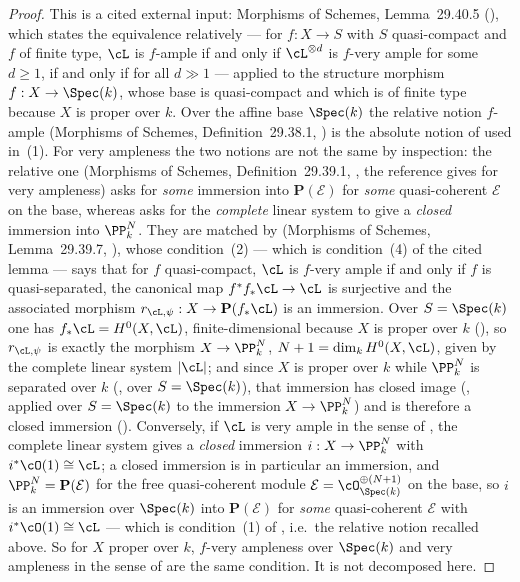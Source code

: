 \begin{proof}
This is a cited external input: Morphisms of Schemes, Lemma~29.40.5
(), which states
the equivalence relatively --- for $f:X\to S$ with $S$ quasi-compact
and $f$ of finite type, $\cL$ is $f$-ample if and only if
$\cL^{\otimes d}$ is $f$-very ample for some $d\ge1$, if and only if
for all $d\gg1$ --- applied to the structure morphism
$f:X\to\Spec(k)$, whose base is quasi-compact and which is of finite
type because $X$ is proper over $k$.  Over the affine base $\Spec(k)$
the relative notion $f$-ample (Morphisms of Schemes,
Definition~29.38.1, ) is
the absolute notion of  used in~(1).  For very
ampleness the two notions are not the same by inspection: the relative
one (Morphisms of Schemes, Definition~29.39.1,
, the reference
 gives for very ampleness) asks for \emph{some}
immersion into $\mathbf P(\mathcal E)$ for \emph{some} quasi-coherent
$\mathcal E$ on the base, whereas  asks for the
\emph{complete} linear system to give a \emph{closed} immersion into
$\PP^N_k$.  They are matched by
 (Morphisms of Schemes,
Lemma~29.39.7, ), whose condition~(2) --- which is
condition~(4) of the cited lemma --- says that for $f$ quasi-compact,
$\cL$ is $f$-very ample if and only if $f$ is quasi-separated, the
canonical map
$f^*f_*\cL\to\cL$ is surjective and the associated morphism
$r_{\cL,\psi}:X\to\mathbf P(f_*\cL)$ is an immersion.  Over
$S=\Spec(k)$ one has $f_*\cL=H^0(X,\cL)$, finite-dimensional because
$X$ is proper over $k$ (), so $r_{\cL,\psi}$
is exactly the morphism $X\to\PP^N_k$, $N+1=\dim_kH^0(X,\cL)$, given
by the complete linear system $|\cL|$; and since $X$ is proper over
$k$ while $\PP^N_k$ is
separated over $k$ (, over
$S=\Spec(k)$), that immersion has closed image
(, applied over $S=\Spec(k)$ to the
immersion $X\to\PP^N_k$) and is therefore a
closed immersion ().  Conversely, if
$\cL$ is very ample in the sense of , the complete
linear system gives a \emph{closed} immersion $i:X\to\PP^N_k$ with
$i^*\cO(1)\cong\cL$; a closed immersion is in particular an immersion,
and $\PP^N_k=\mathbf P(\mathcal E)$ for the free quasi-coherent module
$\mathcal E=\cO_{\Spec(k)}^{\oplus(N+1)}$ on the base, so $i$ is an
immersion over $\Spec(k)$ into $\mathbf P(\mathcal E)$ for \emph{some}
quasi-coherent $\mathcal E$ with $i^*\cO(1)\cong\cL$ --- which is
condition~(1) of , i.e.\ the
relative notion recalled above.  So for $X$ proper over $k$, $f$-very
ampleness over $\Spec(k)$ and very ampleness in the sense of
 are the same condition.  It is not decomposed
here.
\end{proof}

